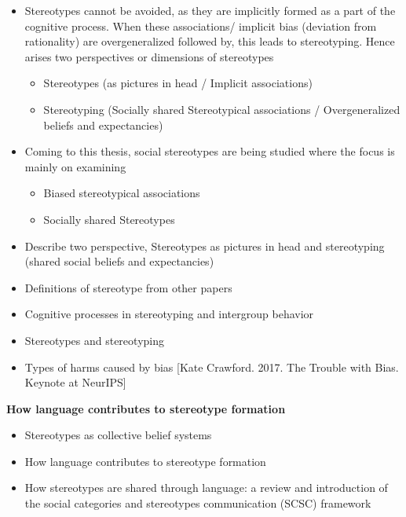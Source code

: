 \begin{itemize}
        \item Stereotypes cannot be avoided, as they are implicitly formed as a part of the cognitive process. When these associations/ implicit bias (deviation from rationality) are overgeneralized followed by, this leads to stereotyping. Hence arises two perspectives or dimensions of stereotypes 
            \begin{itemize}
                \item Stereotypes (as pictures in head / Implicit associations)
                \item Stereotyping (Socially shared Stereotypical associations / Overgeneralized beliefs and expectancies) 
            \end{itemize}
            \item Coming to this thesis, social stereotypes are being studied where the focus is mainly on examining 
            \begin{itemize}
                \item Biased stereotypical associations
                \item Socially shared Stereotypes
            \end{itemize}
\end{itemize}
\begin{itemize}
    \item Describe two perspective, Stereotypes as pictures in head and stereotyping (shared social beliefs and expectancies)
    \item Definitions of stereotype from other papers
    \item Cognitive processes in stereotyping and intergroup behavior \cite{hamilton2015cognitive}
    \item Stereotypes and stereotyping \cite{macrae1996stereotypes}
    \item Types of harms caused by bias [Kate Crawford. 2017. The Trouble with Bias. Keynote
at NeurIPS]
\end{itemize}
\textbf{How language contributes to stereotype formation}
    \begin{itemize}
        \item Stereotypes as collective belief systems \cite{macrae1996stereotypes}
        \item How language contributes to stereotype formation \cite{burgers2020language}
        \item How stereotypes are shared through language: a
    review and introduction of the social categories
    and stereotypes communication (SCSC) framework \cite{beukeboom2019stereotypes}
    \end{itemize}
